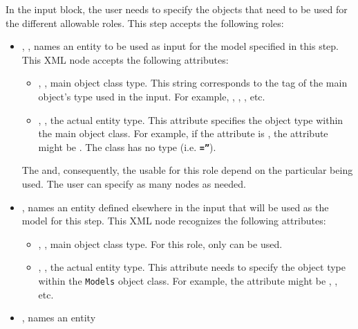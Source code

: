 \vspace{-5mm}
In the  input block, the user needs to specify the objects
that need to be used for the different allowable roles.
%
This step accepts the following roles:
\vspace{-5mm}
\begin{itemize}
\item {}, , names an entity to
be used as input for the model specified in this step.
This XML node accepts the following attributes:
\begin{itemize}
  \item {}, , main object class
    type.
    This string corresponds to the tag of the main object's type used in the
    input.
    For example, , , ,
    etc.
  \item {}, , the actual entity
    type.
    This attribute specifies the object type within the main object class.
    For example, if the   attribute is , the
     attribute might be .
    \nb The class  has no type (i.e.
    \textbf{\texttt{=''}}).
\end{itemize}
\nb The  and, consequently, the  usable for this
role depend on the particular  being used.
The user can specify as many  nodes as needed.
\item {},  names an entity
defined elsewhere in the input that will be used as the model for this step.
This XML node recognizes the following attributes:
\begin{itemize}
  \item {}, , main object class
    type.
    For this role, only  can be used.
  \item {}, , the actual entity
    type.
    This attribute needs to specify the object type within the \texttt{Models}
    object class.
    For example, the  attribute might be ,
    , etc.
\end{itemize}
\item {},  names an entity

\end{itemize}

